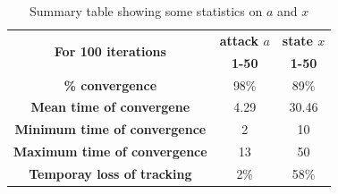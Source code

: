 \begin{table}[h!]
\centering
\begin{tabular}{|c|c|c|}
\hline
\multirow{2}{*}{\textbf{For 100 iterations}} & \multicolumn{1}{|c|}{\textbf{attack $a$}} & \multicolumn{1}{|c|}{\textbf{state $x$}} \\
\cline{2-3}
 & \textbf{1-50} & \textbf{1-50}\\
\hline
\textbf{\% convergence} &98\% &89\%  \\
\hline
\textbf{Mean time of convergene} &4.29 &30.46 \\
\hline
\textbf{Minimum time of convergence} &2 &10  \\
\hline
\textbf{Maximum time of convergence} &13 &50 \\
\hline
\textbf{Temporay loss of tracking} &2\% &58\%  \\
\hline
\end{tabular}
\caption{Summary table showing some statistics on $a$ and $x$}
\label{table:1}
\end{table}
            
